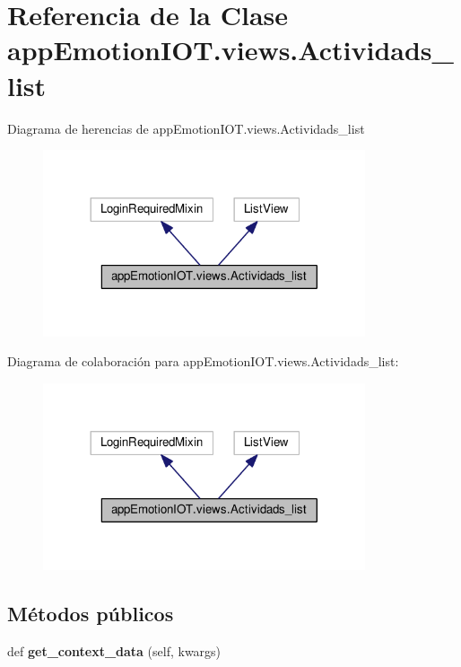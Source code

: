 \hypertarget{classappEmotionIOT_1_1views_1_1Actividads__list}{}\section{Referencia de la Clase app\+Emotion\+I\+O\+T.\+views.\+Actividads\+\_\+list}
\label{classappEmotionIOT_1_1views_1_1Actividads__list}


Diagrama de herencias de app\+Emotion\+I\+O\+T.\+views.\+Actividads\+\_\+list
\nopagebreak
\begin{figure}[H]
\begin{center}
\leavevmode
\includegraphics[width=269pt]{classappEmotionIOT_1_1views_1_1Actividads__list__inherit__graph}
\end{center}
\end{figure}


Diagrama de colaboración para app\+Emotion\+I\+O\+T.\+views.\+Actividads\+\_\+list\+:
\nopagebreak
\begin{figure}[H]
\begin{center}
\leavevmode
\includegraphics[width=269pt]{classappEmotionIOT_1_1views_1_1Actividads__list__coll__graph}
\end{center}
\end{figure}
\subsection*{Métodos públicos}
\begin{DoxyCompactItemize}
\item 
def {\bfseries get\+\_\+context\+\_\+data} (self, kwargs)\hypertarget{classappEmotionIOT_1_1views_1_1Actividads__list_a1d9f82035032d4bb9663174a0e374798}{}\label{classappEmotionIOT_1_1views_1_1Actividads__list_a1d9f82035032d4bb9663174a0e374798}

\end{DoxyCompactItemize}

